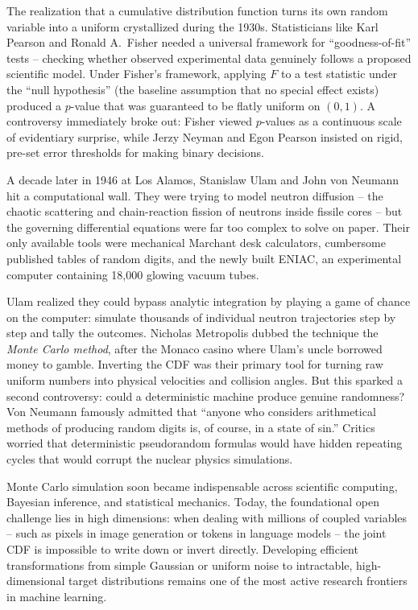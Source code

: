\begin{historybox}
The realization that a cumulative distribution function turns its own random variable into a
uniform crystallized during the 1930s. Statisticians like Karl Pearson and Ronald A.\ Fisher
needed a universal framework for ``goodness-of-fit'' tests -- checking whether observed
experimental data genuinely follows a proposed scientific model. Under Fisher's framework,
applying $F$ to a test statistic under the ``null hypothesis'' (the baseline assumption that no
special effect exists) produced a $p$-value that was guaranteed to be flatly uniform on $(0,1)$.
A controversy immediately broke out: Fisher viewed $p$-values as a continuous scale of evidentiary
surprise, while Jerzy Neyman and Egon Pearson insisted on rigid, pre-set error thresholds for
making binary decisions.

A decade later in 1946 at Los Alamos, Stanislaw Ulam and John von Neumann hit a computational wall.
They were trying to model neutron diffusion -- the chaotic scattering and chain-reaction fission
of neutrons inside fissile cores -- but the governing differential equations were far too
complex to solve on paper. Their only available tools were mechanical Marchant desk calculators,
cumbersome published tables of random digits, and the newly built ENIAC, an experimental
computer containing 18,000 glowing vacuum tubes.

Ulam realized they could bypass analytic integration by playing a game of chance on the computer:
simulate thousands of individual neutron trajectories step by step and tally the outcomes.
Nicholas Metropolis dubbed the technique the \emph{Monte Carlo method}, after the Monaco casino
where Ulam's uncle borrowed money to gamble. Inverting the CDF was their primary tool for turning
raw uniform numbers into physical velocities and collision angles. But this sparked a second
controversy: could a deterministic machine produce genuine randomness? Von Neumann famously
admitted that ``anyone who considers arithmetical methods of producing random digits is, of
course, in a state of sin.'' Critics worried that deterministic pseudorandom formulas would have
hidden repeating cycles that would corrupt the nuclear physics simulations.

Monte Carlo simulation soon became indispensable across scientific computing, Bayesian inference, and statistical
mechanics. Today, the foundational open challenge lies in high dimensions: when dealing with
millions of coupled variables -- such as pixels in image generation or tokens in language models --
the joint CDF is impossible to write down or invert directly. Developing efficient transformations
from simple Gaussian or uniform noise to intractable, high-dimensional target distributions
remains one of the most active research frontiers in machine learning.
\end{historybox}

